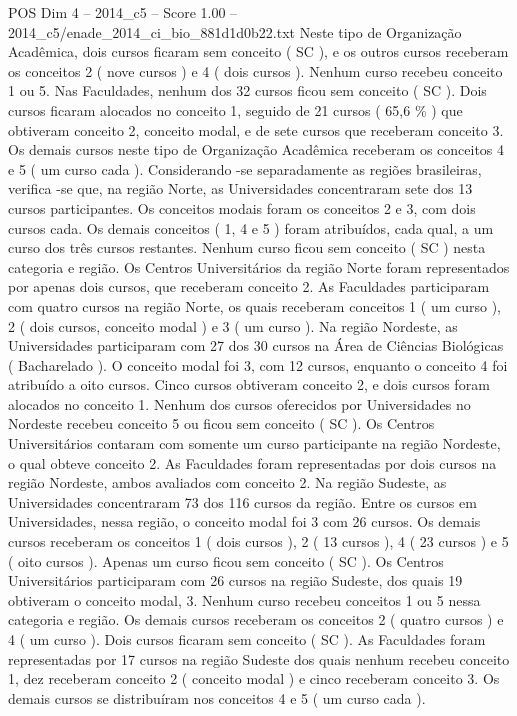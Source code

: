 \begin{textsample}{POS Dim 4 – 2014\_c5 – Score 1.00 – 2014\_c5/enade\_2014\_ci\_bio\_881d1d0b22.txt}
Neste tipo de Organização Acadêmica, dois cursos ficaram sem conceito ( SC ), e os outros cursos receberam os conceitos 2 ( nove cursos ) e 4 ( dois cursos ).
Nenhum curso recebeu conceito 1 ou 5.
Nas Faculdades, nenhum dos 32 cursos ficou sem conceito ( SC ).
Dois cursos ficaram alocados no conceito 1, seguido de 21 cursos ( 65,6 \% ) que obtiveram conceito 2, conceito modal, e de sete cursos que receberam conceito 3.
Os demais cursos neste tipo de Organização Acadêmica receberam os conceitos 4 e 5 ( um curso cada ).
Considerando -se separadamente as regiões brasileiras, verifica -se que, na região Norte, as Universidades concentraram sete dos 13 cursos participantes.
Os conceitos modais foram os conceitos 2 e 3, com dois cursos cada.
Os demais conceitos ( 1, 4 e 5 ) foram atribuídos, cada qual, a um curso dos três cursos restantes.
Nenhum curso ficou sem conceito ( SC ) nesta categoria e região.
Os Centros Universitários da região Norte foram representados por apenas dois cursos, que receberam conceito 2.
As Faculdades participaram com quatro cursos na região Norte, os quais receberam conceitos 1 ( um curso ), 2 ( dois cursos, conceito modal ) e 3 ( um curso ).
Na região Nordeste, as Universidades participaram com 27 dos 30 cursos na Área de Ciências Biológicas ( Bacharelado ).
O conceito modal foi 3, com 12 cursos, enquanto o conceito 4 foi atribuído a oito cursos.
Cinco cursos obtiveram conceito 2, e dois cursos foram alocados no conceito 1.
Nenhum dos cursos oferecidos por Universidades no Nordeste recebeu conceito 5 ou ficou sem conceito ( SC ).
Os Centros Universitários contaram com somente um curso participante na região Nordeste, o qual obteve conceito 2.
As Faculdades foram representadas por dois cursos na região Nordeste, ambos avaliados com conceito 2.
Na região Sudeste, as Universidades concentraram 73 dos 116 cursos da região.
Entre os cursos em Universidades, nessa região, o conceito modal foi 3 com 26 cursos.
Os demais cursos receberam os conceitos 1 ( dois cursos ), 2 ( 13 cursos ), 4 ( 23 cursos ) e 5 ( oito cursos ).
Apenas um curso ficou sem conceito ( SC ).
Os Centros Universitários participaram com 26 cursos na região Sudeste, dos quais 19 obtiveram o conceito modal, 3.
Nenhum curso recebeu conceitos 1 ou 5 nessa categoria e região.
Os demais cursos receberam os conceitos 2 ( quatro cursos ) e 4 ( um curso ).
Dois cursos ficaram sem conceito ( SC ).
As Faculdades foram representadas por 17 cursos na região Sudeste dos quais nenhum recebeu conceito 1, dez receberam conceito 2 ( conceito modal ) e cinco receberam conceito 3.
Os demais cursos se distribuíram nos conceitos 4 e 5 ( um curso cada ).

\end{textsample}

